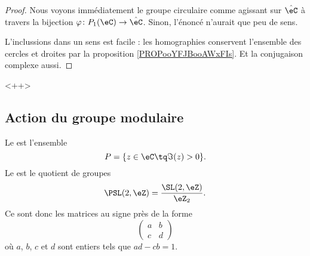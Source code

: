 \begin{proof}
    Nous voyons immédiatement le groupe circulaire comme agissant sur \( \hat\eC\) à travers la bijection \( \varphi\colon P_1(\eC)\to \hat \eC\). Sinon, l'énoncé n'aurait que peu de sens.

    L'inclussions dans un sens est facile : les homographies conservent l'ensemble des cercles et droites par la proposition \ref{PROPooYFJBooAWxFIs}. Et la conjugaison complexe aussi.
\end{proof}
<++>


\subsection{Action du groupe modulaire}

Le  est l'ensemble
\begin{equation}
    P=\{ z\in \eC\tq \Im(z)>0 \}.
\end{equation}
Le  est le quotient de groupes
\begin{equation}
    \PSL(2,\eZ)=\frac{ \SL(2,\eZ) }{ \eZ_2 }.
\end{equation}
Ce sont donc les matrices au signe près de la forme
\begin{equation}
    \begin{pmatrix}
        a    &   b    \\ 
        c    &   d    
    \end{pmatrix}
\end{equation}
où \( a\), \( b\), \( c\) et \( d\) sont entiers tels que \( ad-cb=1\).

